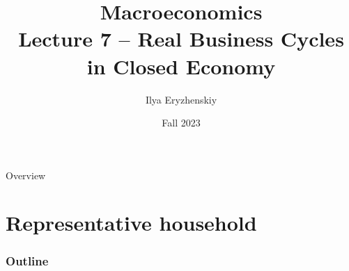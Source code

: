 \documentclass{beamer}
\title[PSME]{Macroeconomics\\ Lecture 7 -- Real Business Cycles in Closed Economy}
\author[I. Eryzhenskiy]{Ilya Eryzhenskiy}
\institute[BdF]{PSME Panth\'{e}on-Sorbonne Master in Economics}
\date[PSME macro]{Fall 2023}
\begin{document}
\begin{frame}
  \maketitle
\end{frame}

\begin{frame}{Overview}
  \tableofcontents
\end{frame}


\section{Representative household}
\begin{frame}
\frametitle{Outline}
\tableofcontents[currentsection]
\end{frame}
\end{document}
